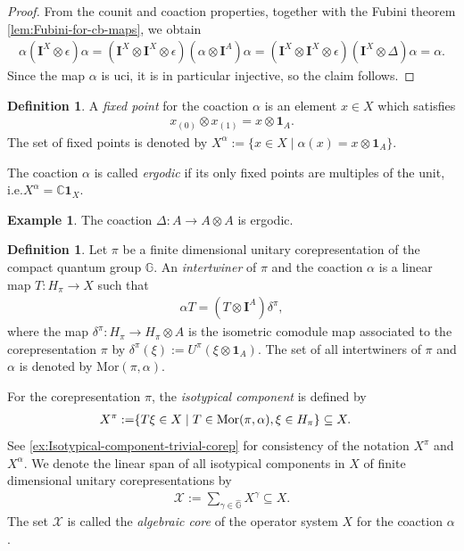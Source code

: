 \documentclass{amsart}
\theoremstyle{plain}
\theoremstyle{definition}
\newtheorem{definition}[theorem]{Definition}
\newtheorem{example}[theorem]{Example}
\theoremstyle{remark}
\begin{document}
	\begin{proof}
		From the counit and coaction properties, together with the Fubini theorem \autoref{lem:Fubini-for-cb-maps}, we obtain
		\begin{align}
			\alpha (\mathbf{I}^X \otimes \epsilon) \alpha
			= (\mathbf{I}^X \otimes \mathbf{I}^X \otimes \epsilon) (\alpha \otimes \mathbf{I}^A) \alpha
			= (\mathbf{I}^X \otimes \mathbf{I}^X \otimes \epsilon) (\mathbf{I}^X \otimes \Delta) \alpha
			= \alpha.
		\end{align}
		Since the map $\alpha$ is uci, it is in particular injective, so the claim follows.
	\end{proof}
	
	\begin{definition}
		A \emph{fixed point} for the coaction $\alpha$ is an element $x \in X$ which satisfies
		\begin{align}
			x_{(0)} \otimes x_{(1)} = x \otimes \mathbf{1}_A.
		\end{align}
		The set of fixed points is denoted by $X^\alpha := \{x \in X \mid \alpha(x) = x \otimes \mathbf{1}_A\}$.
		
		The coaction $\alpha$ is called \emph{ergodic} if its only fixed points are multiples of the unit, i.e.\@ $X^\alpha = \mathbb{C}\mathbf{1}_X$.
	\end{definition}
	
	\begin{example}
		The coaction $\Delta : A \rightarrow A \otimes A$ is ergodic.
	\end{example}
	
	\begin{definition}
		Let $\pi$ be a finite dimensional unitary corepresentation of the compact quantum group $\mathbb{G}$.
		An \emph{intertwiner} of $\pi$ and the coaction $\alpha$ is a linear map $T : H_\pi \rightarrow X$ such that 
		\begin{align}
			\alpha T = (T \otimes \mathbf{I}^A) \delta^\pi,
		\end{align}
		where the map $\delta^\pi : H_\pi \rightarrow H_\pi \otimes A$ is the isometric comodule map associated to the corepresentation $\pi$ by $\delta^\pi(\xi) := U^\pi(\xi \otimes \mathbf{1}_A)$.
		The set of all intertwiners of $\pi$ and $\alpha$ is denoted by $\mathrm{Mor}(\pi,\alpha)$.
		
		For the corepresentation $\pi$, the \emph{isotypical component} is defined by
		\begin{align}
			X^\pi := \span\{T\xi \in X \mid T \in \mathrm{Mor}(\pi,\alpha), \xi \in H_\pi \} \subseteq X.
		\end{align}
		See \autoref{ex:Isotypical-component-trivial-corep} for consistency of the notation $X^\pi$ and $X^\alpha$.
		We denote the linear span of all isotypical components in $X$ of finite dimensional unitary corepresentations by
		\begin{align}
			\mathcal{X} := \sum_{\gamma \in \widehat{\mathbb{G}}} X^\gamma \subseteq X.
		\end{align}
		The set $\mathcal{X}$ is called the \emph{algebraic core} of the operator system $X$ for the coaction $\alpha$.
	\end{definition}	
	
\end{document}
